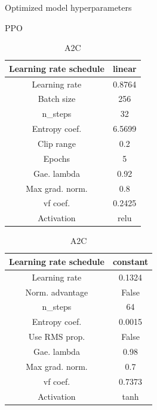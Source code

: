 \documentclass{article}
\begin{document}
\begin{table}[H]
	\label{t:optimParam}
	\caption{Optimized model hyperparameters}
	\begin{subtable}{.4\linewidth}
	\centering
	\caption{PPO}
	\begin{tabular}{c c}
	Learning rate schedule& linear \\
	\hline
	Learning rate & 0.8764 \\
	\hline
	Batch size & 256 \\
	\hline
	n\_steps & 32 \\
	\hline
	Entropy coef. & 6.5699 \\
	\hline
	Clip range & 0.2 \\
	\hline
	Epochs & 5 \\
	\hline
	Gae. lambda & 0.92 \\
	\hline
	Max grad. norm. & 0.8 \\
	\hline
	vf coef. & 0.2425 \\
	\hline
	Activation & relu \\
	\hline
	\end{tabular}
	\end{subtable}%

	\begin{subtable}{.4\linewidth}
	\centering
	\caption{A2C}
	\begin{tabular}{c c}
	Learning rate schedule& constant \\
	\hline
	Learning rate & 0.1324 \\
	\hline
	Norm. advantage & False \\
	\hline
	n\_steps & 64 \\
	\hline
	Entropy coef. & 0.0015 \\
	\hline
	Use RMS prop. & False \\
	\hline
	Gae. lambda & 0.98 \\
	\hline
	Max grad. norm. & 0.7 \\
	\hline
	vf coef. & 0.7373 \\
	\hline
	Activation & tanh \\
	\hline
	\end{tabular}
	\end{subtable}
	
\end{table}
\end{document}
